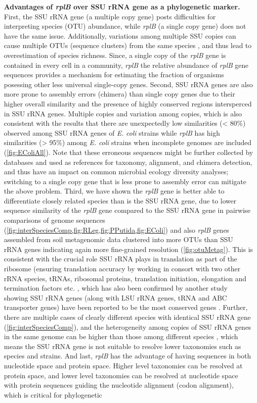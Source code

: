 \documentclass[]{msu-thesis}
\begin{document}
\textbf{Advantages of \textit{rplB} over SSU rRNA gene as a phylogenetic marker. }
First, the SSU rRNA gene (a multiple copy gene) posts difficulties for interpreting species (OTU) abundance, while \textit{rplB} (a single copy gene) does not have the same issue. Additionally, variations among multiple SSU copies can cause multiple OTUs (sequence clusters) from the same species \cite{sun_intragenomic_2013}, and thus lead to overestimation of species richness. Since, a single copy of the \textit{rplB} gene is contained in every cell in a community, \textit{rplB} the relative abundance of \textit{rplB} gene sequences provides a mechanism for estimating the fraction of organisms posessing other less universal single-copy genes. Second, SSU rRNA genes are also more prone to assembly errors (chimera) than single copy genes due to their higher overall similarity and the presence of highly conserved regions intersperced in SSU rRNA genes. Multiple copies and variation among copies, which is also consistent with the results that there are unexpectedly low similarities (< 80\%) observed among SSU rRNA genes of \textit{E. coli} strains while \textit{rplB} has high similarities (> 95\%) among \textit{E. coli} strains when incomplete genomes are included (\cref{fig:EColiAll}). Note that these erroneous sequences might be further collected by databases and used as references for taxonomy, alignment, and chimera detection, and thus have an impact on common microbial ecology diversity analyses; switching to a single copy gene that is less prone to assembly error can mitigate the above problem. Third, we have shown the \textit{rplB} gene is better able to differentiate closely related species than is the SSU rRNA gene, due to lower sequence similarity of the \textit{rplB} gene compared to the SSU rRNA gene in pairwise comparisons of genome sequences (\cref{fig:interSpeciesComp,fig:RLeg,fig:PPutida,fig:EColi}) and also \textit{rplB} genes assembled from soil metagenomic data clustered into more OTUs than SSU rRNA genes indicating again more fine-grained resolution (\cref{fig:otuMetag}). This is consistent with the crucial role SSU rRNA plays in translation as part of the ribosome (ensuring translation accuracy by working in consort with two other rRNA species, tRNAs, ribosomal proteins, translation initiation, elongation and termination factors etc. \cite{carter_functional_2000}, which has also been confirmed by another study showing SSU rRNA genes (along with LSU rRNA genes, tRNA and ABC transporter genes) have been reported to be the most conserved genes \cite{isenbarger_most_2008}. Further, there are multiple cases of clearly different species with identical SSU rRNA gene (\cref{fig:interSpeciesComp}), and the heterogeneity among copies of SSU rRNA genes in the same genome can be higher than those among different species \cite{sun_intragenomic_2013}, which means the SSU rRNA gene is not suitable to resolve lower taxonomies such as species and strains. And last, \textit{rplB} has the advantage of having sequences in both nucleotide space and protein space. Higher level taxonomies can be resolved at protein space, and lower level taxonomies can be resolved at nucleotide space with protein sequences guiding the nucleotide alignment (codon alignment), which is critical for phylogenetic 
\end{document}
